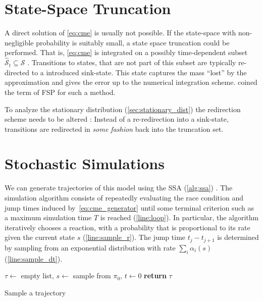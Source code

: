 \section{State-Space Truncation}\label{sec:fsp}
A direct solution of \eqref{eq:cme} is usually not possible.
If the state-space with non-negligible probability is suitably small, a state space
truncation could be performed.
That is, \eqref{eq:cme} is integrated on a possibly time-dependent subset
$\hat{\mathcal{S}}_t\subseteq\mathcal{S}$ \cite{henzinger2009sliding,munsky2006finite,spieler2014numerical}.
Transitions to states, that are not part of this subset are typically re-directed to a introduced sink-state.
This state captures the mass ``lost'' by the approximation and gives the error up to the numerical integration scheme.
\citet{munsky2006finite} coined the term of \acf{FSP} for such a method.

To analyze the stationary distribution (\autoref{sec:stationary_dist}) the redirection scheme needs to be altered \cite{kuntz2021stationary}:
Instead of a re-redirection into a sink-state, transitions are redirected in \emph{some fashion} back into the truncation set.

\section{Stochastic Simulations}\label{sec:ssa}
We can generate trajectories of this model using the \acf{SSA} (\autoref{alg:ssa})  \cite{gillespie1977exact}.
The simulation algorithm consists of repeatedly evaluating the race condition and jump times induced by~\eqref{eq:cme_generator} until some terminal criterion such as a maximum simulation time $T$ is reached (\autoref{line:loop}).
In particular, the algorithm iteratively chooses a reaction, with a probability that is
proportional to its rate given the current state $s$ (\autoref{line:sample_r}).
The jump time $t_j- t_{j+1}$ is determined by sampling from an exponential distribution with rate $\sum_i\alpha_i(s)$ (\autoref{line:sample_dt}).
\begin{algorithm}
    $\tau \leftarrow$ empty list, $s\leftarrow$ sample from $\pi_0$, $t\leftarrow 0$\;
    \textbf{return} $\tau$\;
    \caption{\label{alg:ssa}Sample a trajectory}
\end{algorithm}


